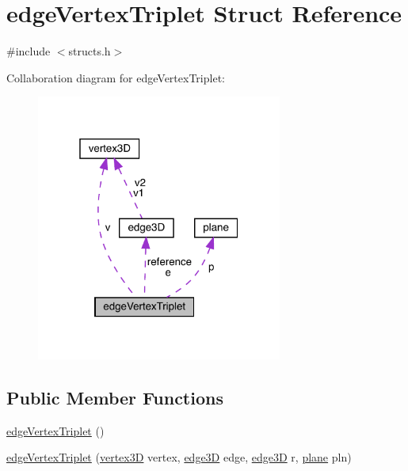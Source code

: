 \hypertarget{structedge_vertex_triplet}{}\section{edge\+Vertex\+Triplet Struct Reference}
\label{structedge_vertex_triplet}


{\ttfamily \#include $<$structs.\+h$>$}



Collaboration diagram for edge\+Vertex\+Triplet\+:
\nopagebreak
\begin{figure}[H]
\begin{center}
\leavevmode
\includegraphics[width=229pt]{structedge_vertex_triplet__coll__graph}
\end{center}
\end{figure}
\subsection*{Public Member Functions}
\begin{DoxyCompactItemize}
\item 
\mbox{\hyperlink{structedge_vertex_triplet_a794c00faebfea5c0bc0b44d7f1e7650c}{edge\+Vertex\+Triplet}} ()
\item 
\mbox{\hyperlink{structedge_vertex_triplet_a50dd657c672509d29a3dff67559c8f6b}{edge\+Vertex\+Triplet}} (\mbox{\hyperlink{structvertex3_d}{vertex3D}} vertex, \mbox{\hyperlink{structedge3_d}{edge3D}} edge, \mbox{\hyperlink{structedge3_d}{edge3D}} r, \mbox{\hyperlink{structplane}{plane}} pln)
\end{DoxyCompactItemize}
